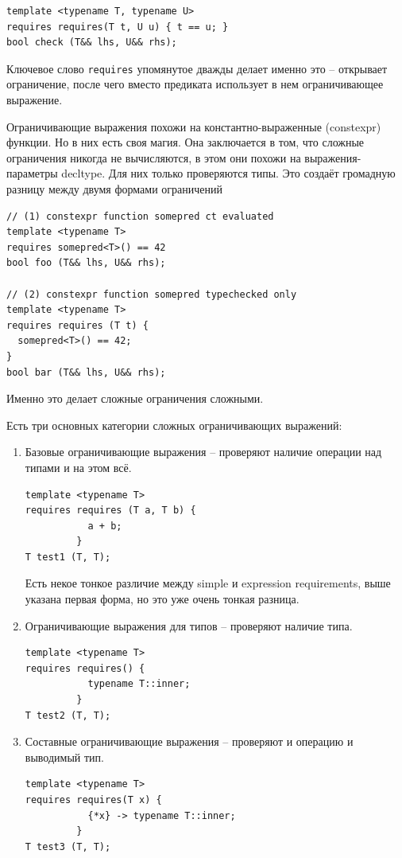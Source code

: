 \documentclass[a4paper,12pt,oneside]{article}
\begin{document}
\begin{lstlisting}
template <typename T, typename U>
requires requires(T t, U u) { t == u; }
bool check (T&& lhs, U&& rhs);
\end{lstlisting}

Ключевое слово \lstinline!requires! упомянутое дважды делает именно это -- открывает ограничение, после чего вместо предиката использует в нем ограничивающее выражение.

Ограничивающие выражения похожи на константно-выраженные (constexpr) функции. Но в них есть своя магия. Она заключается в том, что сложные ограничения никогда не вычисляются, в этом они похожи на выражения-параметры decltype. Для них только проверяются типы. Это создаёт громадную разницу между двумя формами ограничений

\begin{lstlisting}
// (1) constexpr function somepred ct evaluated
template <typename T>
requires somepred<T>() == 42
bool foo (T&& lhs, U&& rhs);

// (2) constexpr function somepred typechecked only
template <typename T>
requires requires (T t) { 
  somepred<T>() == 42;
}
bool bar (T&& lhs, U&& rhs);
\end{lstlisting}

Именно это делает сложные ограничения сложными.

Есть три основных категории сложных ограничивающих выражений:

\begin{enumerate}
\item Базовые ограничивающие выражения -- проверяют наличие операции над типами и на этом всё.

\begin{lstlisting}
template <typename T>
requires requires (T a, T b) {
           a + b;
         }
T test1 (T, T);
\end{lstlisting}

Есть некое тонкое различие между simple и expression requirements, выше указана первая форма, но это уже очень тонкая разница.

\item Ограничивающие выражения для типов -- проверяют наличие типа.

\begin{lstlisting}
template <typename T>
requires requires() {
           typename T::inner;
         }
T test2 (T, T);
\end{lstlisting}

\item Составные ограничивающие выражения -- проверяют и операцию и выводимый тип.

\begin{lstlisting}
template <typename T>
requires requires(T x) {
           {*x} -> typename T::inner;
         }
T test3 (T, T);
\end{lstlisting}

\end{enumerate}
\end{document}
